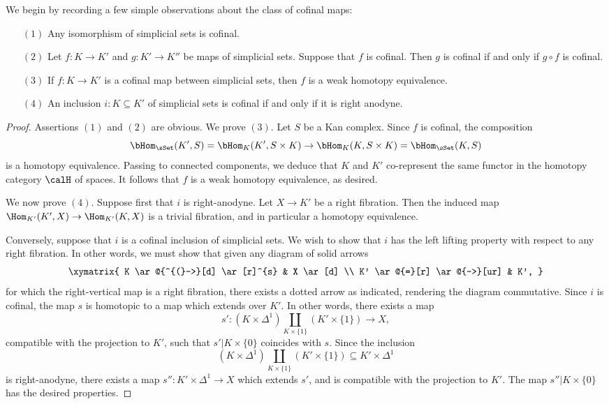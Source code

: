 We begin by recording a few simple observations about the class of cofinal maps:

\begin{proposition}\label{cofbasic}
\begin{itemize}
\item[$(1)$] Any isomorphism of simplicial sets is cofinal.

\item[$(2)$] Let $f: K \rightarrow K'$ and $g: K' \rightarrow K''$ be
maps of simplicial sets. Suppose that $f$ is cofinal. Then $g$ is cofinal if and only if $g \circ f$ is cofinal.

\item[$(3)$] If $f: K \rightarrow K'$ is a cofinal map between simplicial
sets, then $f$ is a weak homotopy equivalence.

\item[$(4)$] An inclusion $i: K \subseteq K'$ of simplicial sets is
cofinal if and only if it is right anodyne.
\end{itemize}
\end{proposition}

\begin{proof}
Assertions $(1)$ and $(2)$ are obvious. We prove $(3)$. Let $S$ be a Kan complex.
Since $f$ is cofinal, the composition
$$ \bHom_{\sSet}(K',S) = \bHom_{K}(K', S \times K) \rightarrow \bHom_{K}(K,S \times
K) = \bHom_{\sSet}(K,S)$$ is a homotopy equivalence. Passing to connected components, we deduce that $K$ and $K'$ co-represent the same functor in the homotopy category $\calH$ of spaces. It follows that $f$ is a weak homotopy equivalence, as desired.

We now prove $(4)$. Suppose first that $i$ is right-anodyne. Let
$X \rightarrow K'$ be a right fibration. Then the induced map $\Hom_{K'}(K',X)
\rightarrow \Hom_{K'}(K,X)$ is a trivial fibration, and in
particular a homotopy equivalence.

Conversely, suppose that $i$ is a cofinal inclusion of simplicial sets. 
We wish to show that $i$ has the left
lifting property with respect to any right fibration. In other
words, we must show that given any diagram of solid arrows
$$ \xymatrix{ K \ar@{^{(}->}[d] \ar[r]^{s} & X \ar[d] \\
K' \ar@{=}[r] \ar@{-->}[ur] & K', }$$
for which the right-vertical map is a right fibration, there exists a dotted arrow as indicated, rendering the diagram commutative. Since $i$ is cofinal, the map $s$ is homotopic
to a map which extends over $K'$. In other words, there exists a map
$$ s': (K \times \Delta^1) \coprod_{ K \times \{1\} } (K'
\times \{1\}) \rightarrow X,$$
compatible with the projection to $K'$, such that $s'| K \times \{0\}$ coincides with $s$.
Since the inclusion $$ (K \times \Delta^1) \coprod_{K \times \{1\} } (K' \times \{1\}) \subseteq
K' \times \Delta^1$$ is right-anodyne, there exists a map $s'': K' \times \Delta^1 \rightarrow
X$ which extends $s'$, and is compatible with the projection to $K'$. The map
$s'' | K \times \{0\}$ has the desired properties.
\end{proof}

